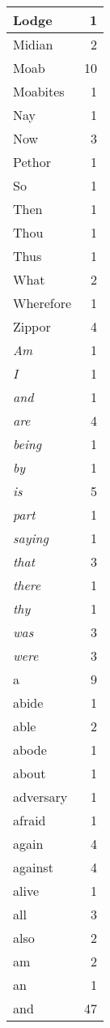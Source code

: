 \begin{center}
\begin{longtable}{l|r}
Lodge & 1\\ \hline 
Midian & 2\\ \hline 
Moab & 10\\ \hline 
Moabites & 1\\ \hline 
Nay & 1\\ \hline 
Now & 3\\ \hline 
Pethor & 1\\ \hline 
So & 1\\ \hline 
Then & 1\\ \hline 
Thou & 1\\ \hline 
Thus & 1\\ \hline 
What & 2\\ \hline 
Wherefore & 1\\ \hline 
Zippor & 4\\ \hline 
\emph{Am} & 1\\ \hline 
\emph{I} & 1\\ \hline 
\emph{and} & 1\\ \hline 
\emph{are} & 4\\ \hline 
\emph{being} & 1\\ \hline 
\emph{by} & 1\\ \hline 
\emph{is} & 5\\ \hline 
\emph{part} & 1\\ \hline 
\emph{saying} & 1\\ \hline 
\emph{that} & 3\\ \hline 
\emph{there} & 1\\ \hline 
\emph{thy} & 1\\ \hline 
\emph{was} & 3\\ \hline 
\emph{were} & 3\\ \hline 
a & 9\\ \hline 
abide & 1\\ \hline 
able & 2\\ \hline 
abode & 1\\ \hline 
about & 1\\ \hline 
adversary & 1\\ \hline 
afraid & 1\\ \hline 
again & 4\\ \hline 
against & 4\\ \hline 
alive & 1\\ \hline 
all & 3\\ \hline 
also & 2\\ \hline 
am & 2\\ \hline 
an & 1\\ \hline 
and & 47\\ \hline 

\end{longtable}
\end{center}
